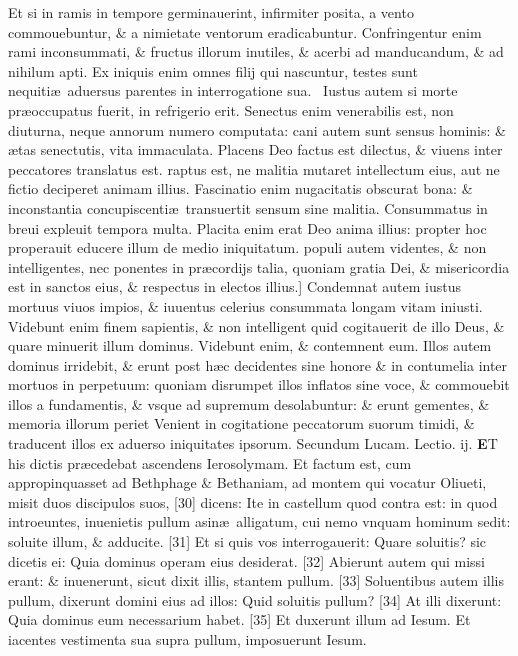 \documentclass[a5paper,10pt]{book}
\def\leftmarginnote{%
	\lrmarginnote{\hskip -\marginparsep \hskip -6.5em}}
\def\rightmarginnote{%
	\lrmarginnote{\hskip\columnwidth \hskip -1em}}
\def\ae{æ}
\begin{document}
\begin{multicols*}{2}
Et si in ramis in tempore
germinauerint, infirmiter posita, a vento commouebuntur, \& a nimietate ventorum eradicabuntur.
Confringentur enim rami inconsummati, \& fructus illorum inutiles, \& acerbi ad manducandum, \& ad nihilum apti.
Ex iniquis enim omnes filij qui nascuntur, testes sunt nequiti\ae \ aduersus parentes in interrogatione sua. \textdagger \ 
Iustus\leftmarginnote{\begin{flushright}C\end{flushright}} autem si morte pr\ae occupatus fuerit, in refrigerio erit.
Senectus enim venerabilis est, non diuturna, neque annorum numero computata: cani autem sunt sensus hominis: \& \ae tas senectutis, vita immaculata.
Placens Deo factus est dilectus, \& viuens inter peccatores translatus est.
raptus est, ne malitia mutaret intellectum eius, aut ne fictio deciperet animam illius. Fascinatio enim nugacitatis obscurat bona: \& inconstantia concupiscenti\ae \ transuertit sensum sine malitia.
Consummatus in breui expleuit tempora multa. Placita enim erat Deo anima illius: propter hoc properauit educere illum de medio iniquitatum.
populi autem videntes, \& non intelligentes, nec ponentes in pr\ae cordijs talia, quoniam gratia Dei, \& misericordia est in sanctos eius, \& respectus in electos illius.]
Condemnat\rightmarginnote{D} autem iustus mortuus viuos impios, \& iuuentus celerius consummata longam vitam iniusti.
Videbunt enim finem sapientis, \& non intelligent quid cogitauerit de illo Deus, \& quare minuerit illum dominus.
Videbunt enim, \& contemnent eum. Illos autem dominus irridebit, \& erunt post h\ae c decidentes sine honore \& in contumelia inter mortuos in perpetuum: quoniam disrumpet illos inflatos sine voce, \& commouebit illos a fundamentis, \& vsque ad supremum desolabuntur: \& erunt gementes, \& memoria illorum periet
Venient in cogitatione peccatorum suorum timidi, \& traducent illos ex aduerso iniquitates ipsorum.
\newline \color{red} Secundum Lucam. \hfill Lectio. ij. \color{black}
\vspace{-.25em}
\lettrine[lines=2]{\bfseries \color{red} E}{}T\rightmarginnote{c. 19.} his dictis pr\ae cedebat ascendens Ierosolymam.
Et factum est, cum appropinquasset ad Bethphage \& Bethaniam, ad montem qui vocatur Oliueti, misit duos discipulos suos, [30] dicens: Ite in castellum quod contra est: in quod introeuntes, inuenietis pullum asin\ae \ alligatum, cui nemo vnquam hominum sedit: soluite illum, \& adducite.
[31] Et si quis vos interrogauerit: Quare soluitis? sic dicetis ei: Quia dominus operam eius desiderat. [32] Abierunt autem qui missi erant: \& inuenerunt, sicut dixit illis, stantem pullum. [33] Soluentibus autem illis pullum, dixerunt domini eius ad illos: Quid soluitis pullum? [34] At illi dixerunt: Quia dominus eum necessarium habet. [35] Et duxerunt illum ad Iesum. Et iacentes vestimenta sua supra pullum, imposuerunt Iesum.

\end{multicols*}
\end{document}
